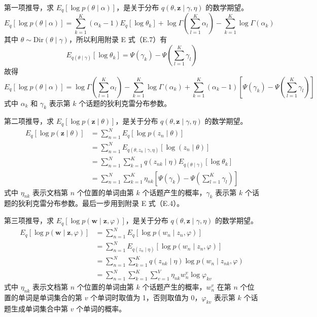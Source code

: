 \documentclass[UTF8,12pt,a4paper,fontset=fandol]{ctexart}
\begin{document}
第一项推导，求 $E_q[\log p(\theta\mid\alpha)]$，是关于分布 $q(\theta,\mathbf{z}\mid\gamma,\eta)$ 的数学期望。
\begin{equation}
E_q[\log p(\theta\mid\alpha)]=\sum_{k=1}^K(\alpha_k-1)E_q[\log\theta_k]+\log\Gamma\left(\sum_{l=1}^K\alpha_l\right)-\sum_{k=1}^K\log\Gamma(\alpha_k)
\tag{20.49}
\end{equation}
其中 $\theta\sim\mathrm{Dir}(\theta\mid\gamma)$，所以利用附录 E 式（E.7）有
\begin{equation}
E_{q(\theta\mid\gamma)}[\log\theta_k]=\Psi(\gamma_k)-\Psi\left(\sum_{l=1}^K\gamma_l\right)
\tag{20.50}
\end{equation}
故得
\begin{equation}
E_q[\log p(\theta\mid\alpha)]=\log\Gamma\left(\sum_{l=1}^K\alpha_l\right)-\sum_{k=1}^K\log\Gamma(\alpha_k)+\sum_{k=1}^K(\alpha_k-1)\left[\Psi(\gamma_k)-\Psi\left(\sum_{l=1}^K\gamma_l\right)\right]
\tag{20.51}
\end{equation}
式中 $\alpha_k$ 和 $\gamma_k$ 表示第 $k$ 个话题的狄利克雷分布参数。

第二项推导，求 $E_q[\log p(\mathbf{z}\mid\theta)]$，是关于分布 $q(\theta,\mathbf{z}\mid\gamma,\eta)$ 的数学期望。
\begin{equation}
\begin{aligned}
E_q[\log p(\mathbf{z}\mid\theta)]
&=\sum_{n=1}^N E_q[\log p(z_n\mid\theta)]\\
&=\sum_{n=1}^N E_{q(\theta,z_n\mid\gamma,\eta)}[\log(z_n\mid\theta)]\\
&=\sum_{n=1}^N\sum_{k=1}^K q(z_{nk}\mid\eta)E_{q(\theta\mid\gamma)}[\log\theta_k]\\
&=\sum_{n=1}^N\sum_{k=1}^K \eta_{nk}\left[\Psi(\gamma_k)-\Psi\left(\sum_{l=1}^K\gamma_l\right)\right]
\end{aligned}
\tag{20.52}
\end{equation}
式中 $\eta_{nk}$ 表示文档第 $n$ 个位置的单词由第 $k$ 个话题产生的概率，$\gamma_k$ 表示第 $k$ 个话题的狄利克雷分布参数。最后一步用到附录 E 式（E.4）。

第三项推导，求 $E_q[\log p(\mathbf{w}\mid\mathbf{z},\varphi)]$，是关于分布 $q(\theta,\mathbf{z}\mid\gamma,\eta)$ 的数学期望。
\begin{equation}
\begin{aligned}
E_q[\log p(\mathbf{w}\mid\mathbf{z},\varphi)]
&=\sum_{n=1}^N E_q[\log p(w_n\mid z_n,\varphi)]\\
&=\sum_{n=1}^N E_{q(z_n\mid\eta)}[\log p(w_n\mid z_n,\varphi)]\\
&=\sum_{n=1}^N\sum_{k=1}^K q(z_{nk}\mid\eta)\log p(w_n\mid z_{nk},\varphi)\\
&=\sum_{n=1}^N\sum_{k=1}^K\sum_{v=1}^V \eta_{nk}w_n^v\log\varphi_{kv}
\end{aligned}
\tag{20.53}
\end{equation}
式中 $\eta_{nk}$ 表示文档第 $n$ 个位置的单词由第 $k$ 个话题产生的概率，$w_n^v$ 在第 $n$ 个位置的单词是单词集合的第 $v$ 个单词时取值为 1，否则取值为 0，$\varphi_{kv}$ 表示第 $k$ 个话题生成单词集合中第 $v$ 个单词的概率。
\end{document}
